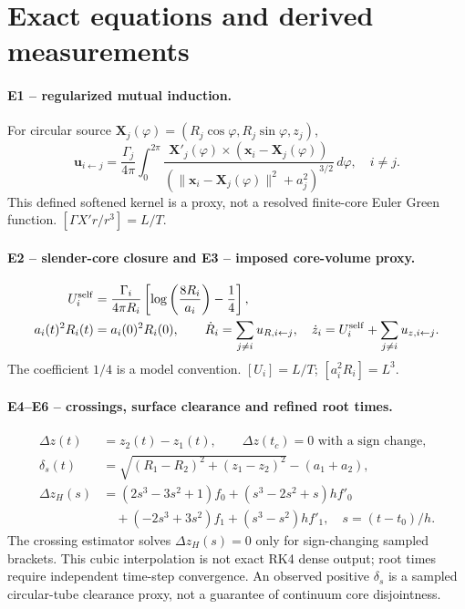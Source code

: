 \documentclass[10pt,a4paper]{article}
\begin{document}
\section{Exact equations and derived measurements}
\paragraph{E1 -- regularized mutual induction.} For circular source $\mathbf X_j(\varphi)=(R_j\cos\varphi,R_j\sin\varphi,z_j)$,
\begin{equation}
\mathbf u_{i\gets j}=\frac{\Gamma_j}{4\pi}\int_0^{2\pi}
\frac{\mathbf X'_j(\varphi)\times(\mathbf x_i-\mathbf X_j(\varphi))}{(\lVert\mathbf x_i-\mathbf X_j(\varphi)\rVert^2+a_j^2)^{3/2}}\,d\varphi,\quad i\ne j.
\end{equation}
This defined softened kernel is a proxy, not a resolved finite-core Euler Green function. $[\Gamma X'r/r^3]=L/T$.
\paragraph{E2 -- slender-core closure and E3 -- imposed core-volume proxy.}
\begin{align}
U_i^{\rm self}&=\frac{\Gamma_i}{4\pi R_i}\left[\log\left(\frac{8R_i}{a_i}\right)-\frac14\right],\\
a_i(t)^2R_i(t)&=a_i(0)^2R_i(0),\qquad
\dot R_i=\sum_{j\ne i}u_{R,i\gets j},\quad \dot z_i=U_i^{\rm self}+\sum_{j\ne i}u_{z,i\gets j}.
\end{align}
The coefficient $1/4$ is a model convention. $[U_i]=L/T$; $[a_i^2R_i]=L^3$.
\paragraph{E4--E6 -- crossings, surface clearance and refined root times.}
\begin{align}
\Delta z(t)&=z_2(t)-z_1(t),\qquad \Delta z(t_c)=0\text{ with a sign change},\\
\delta_s(t)&=\sqrt{(R_1-R_2)^2+(z_1-z_2)^2}-(a_1+a_2),\\
\Delta z_H(s)&=(2s^3-3s^2+1)f_0+(s^3-2s^2+s)hf'_0\\
&\quad+(-2s^3+3s^2)f_1+(s^3-s^2)hf'_1,\quad s=(t-t_0)/h.
\end{align}
The crossing estimator solves $\Delta z_H(s)=0$ only for sign-changing sampled brackets. This cubic interpolation is not exact RK4 dense output; root times require independent time-step convergence. An observed positive $\delta_s$ is a sampled circular-tube clearance proxy, not a guarantee of continuum core disjointness.
\end{document}
